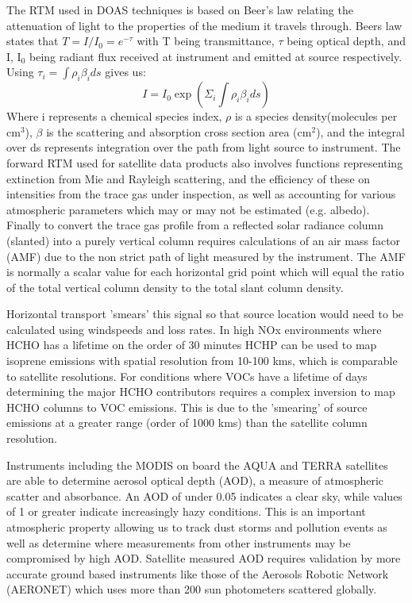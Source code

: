 The RTM used in DOAS techniques is based on Beer's law relating the attenuation of light to the properties of the medium it travels through.
Beers law states that $ T = I/I_0 = e^{-\tau} $ with T being transmittance, $\tau$ being optical depth, and I, I$_0$ being radiant flux received at instrument and emitted at source respectively.
Using 
$ \tau_i = \int \rho_i \beta_i ds $ gives us:
$$ I = I_0 \exp {\left( \Sigma_i \int \rho_i \beta_i ds \right) } $$
Where i represents a chemical species index, $\rho$ is a species density(molecules per cm$^3$), $\beta$ is the scattering and absorption cross section area (cm$^2$), and the integral over ds represents integration over the path from light source to instrument.
The forward RTM used for satellite data products also involves functions representing extinction from Mie and Rayleigh scattering, and the efficiency of these on intensities from the trace gas under inspection, as well as accounting for various atmospheric parameters which may or may not be estimated (e.g. albedo).
Finally to convert the trace gas profile from a reflected solar radiance column (slanted) into a purely vertical column requires calculations of an air mass factor (AMF) due to the non strict path of light measured by the instrument.
The AMF is normally a scalar value for each horizontal grid point which will equal the ratio of the total vertical column density to the total slant column density.

Horizontal transport 'smears' this signal so that source location would need to be calculated using windspeeds and loss rates.
In high NOx environments where HCHO has a lifetime on the order of 30 minutes HCHP can be used to map isoprene emissions with spatial resolution from 10-100 kms, which is comparable to satellite resolutions.
For conditions where VOCs have a lifetime of days determining the major HCHO contributors requires a complex inversion to map HCHO columns to VOC emissions.
This is due to the 'smearing' of source emissions at a greater range (order of 1000 kms) than the satellite column resolution.

Instruments including the MODIS on board the AQUA and TERRA satellites are able to determine aerosol optical depth (AOD), a measure of atmospheric scatter and absorbance. 
An AOD of under 0.05 indicates a clear sky, while values of 1 or greater indicate increasingly hazy conditions.
This is an important atmospheric property allowing us to track dust storms and pollution events as well as determine where measurements from other instruments may be compromised by high AOD.
Satellite measured AOD requires validation by more accurate ground based instruments like those of the Aerosols Robotic Network (AERONET) which uses more than 200 sun photometers scattered globally. 
